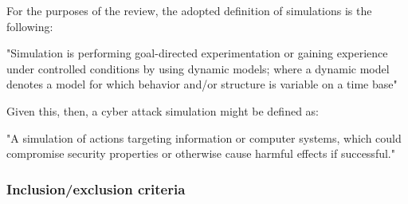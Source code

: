 \documentclass{article}
\begin{document}
For the purposes of the review, the adopted definition of simulations is the following:

\begin{displayquote}
"Simulation is performing goal-directed experimentation or gaining experience under controlled conditions by using dynamic models; where a dynamic model denotes a model for which behavior and/or structure is variable on a time base"\cite[p6]{oren2017}
\end{displayquote}

\noindent Given this, then, a cyber attack simulation might be defined as:

\begin{displayquote}

"A simulation of actions targeting information or computer systems, which could compromise security properties or otherwise cause harmful effects if successful."

\end{displayquote}{}

\subsubsection{Inclusion/exclusion criteria}
\end{document}
